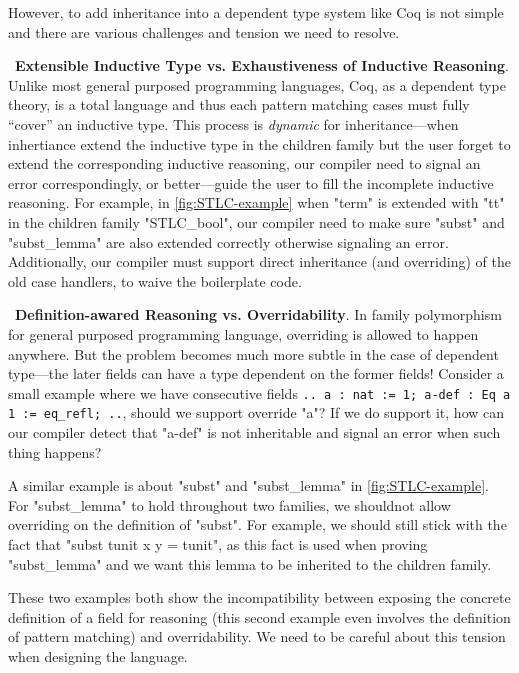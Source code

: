 However, to add inheritance into a dependent type system like Coq is not simple and there are various challenges and tension we need to resolve. 


~\textbf{Extensible Inductive Type vs. Exhaustiveness of Inductive Reasoning}. Unlike most general purposed programming languages, Coq, as a dependent type theory, is a total language and thus each pattern matching cases must fully ``cover'' an inductive type. This process is \textit{dynamic} for inheritance---when inhertiance extend the inductive type in the children family but the user forget to extend the corresponding inductive reasoning, our compiler need to signal an error correspondingly, or better---guide the user to fill the incomplete inductive reasoning. For example, in \cref{fig:STLC-example} when "term" is extended with "tt" in the children family "STLC_bool", our compiler need to make sure "subst" and "subst_lemma" are also extended correctly otherwise signaling an error.
Additionally, our compiler must support direct inheritance (and overriding) of the old case handlers, to waive the boilerplate code. 


~\textbf{Definition-awared Reasoning vs. Overridability}. In family polymorphism for general purposed programming language, overriding is allowed to happen anywhere. But the problem becomes much more subtle in the case of dependent type---the later fields can have a type dependent on the former fields! Consider a small example where we have consecutive fields \texttt{{.. a : nat := 1; a-def : Eq a 1 := eq_refl; ..}}, should we support override "a"? If we do support it, how can our compiler detect that "a-def" is not inheritable and signal an error when such thing happens? 

A similar example is about "subst" and "subst_lemma" in \cref{fig:STLC-example}. For "subst_lemma" to hold throughout two families, we shouldnot allow overriding on the definition of "subst". For example, we should still stick with the fact that "subst tunit x y = tunit", as this fact is used when proving "subst_lemma" and we want this lemma to be inherited to the children family.

These two examples both show the incompatibility between exposing the concrete definition of a field for reasoning (this second example even involves the definition of pattern matching) and overridability. We need to be careful about this tension when designing the language.

